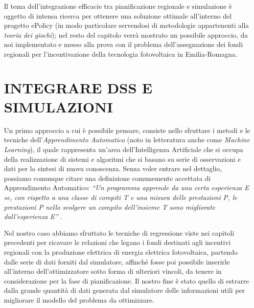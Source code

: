 \documentclass[12pt,a4paper,openright,twoside]{report}
\begin{document}
Il tema dell'integrazione efficacie tra pianificazione regionale e simulazione è oggetto di intensa ricerca per ottenere una soluzione ottimale all'interno del progetto ePolicy (in modo particolare servendosi di metodologie appartenenti alla \emph{teoria dei giochi}); nel resto del capitolo verrà mostrato un possibile approccio, da noi implementato e messo alla prova con il problema dell'assegnazione dei fondi regionali per l'incentivazione della tecnologia fotovoltaica in Emilia-Romagna.

\section{INTEGRARE DSS E SIMULAZIONI}
Un primo approccio a cui è possibile pensare, consiste nello sfruttare i metodi e le tecniche dell'\emph{Apprendimento Automatico} (noto in letteratura anche come \emph{Machine Learning}), il quale rappresenta un'area dell'Intelligenza Artificiale che si occupa della realizzazione di sistemi e algoritmi che si basano su serie di osservazioni e dati per la sintesi di nuova conoscenza. Senza voler entrare nel dettaglio, possiamo comunque citare una definizione comunemente accettata di Apprendimento Automatico: \emph{``Un programma apprende da una certa esperienza E se, con rispetto a una classe di compiti T e una misura delle prestazioni P, le prestazioni P nello svolgere un compito dell'insieme T sono migliorate dall'esperienza E''} \cite{Mitchell}.
 
Nel nostro caso abbiamo sfruttato le tecniche di regressione viste nei capitoli precedenti per ricavare le relazioni che legano i fondi destinati agli incentivi regionali con la produzione elettrica di energia elettrica fotovoltaica, partendo dalle serie di dati forniti dal simulatore, affinché fosse poi possibile inserirle all'interno dell'ottimizzatore sotto forma di ulteriori vincoli, da tenere in considerazione per la fase di pianificazione. Il nostro fine è stato quello di estrarre dalla grande quantità di dati generata dal simulatore delle informazioni utili per migliorare il modello del problema da ottimizzare.
\end{document}
